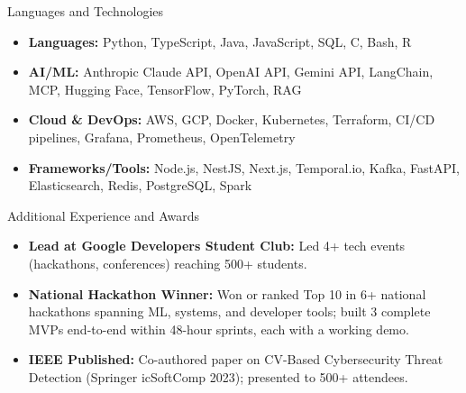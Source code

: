 \documentclass[]{mcdowellcv}
\begin{document}
\begin{cvsection}{Languages and Technologies}
  \begin{cvsubsection}{}{}{}
    \begin{itemize}
      \item \textbf{Languages:} Python, TypeScript, Java, JavaScript, SQL, C, Bash, R
      \item \textbf{AI/ML:} Anthropic Claude API, OpenAI API, Gemini API, LangChain, MCP, Hugging Face, TensorFlow, PyTorch, RAG
      \item \textbf{Cloud \& DevOps:} AWS, GCP, Docker, Kubernetes, Terraform, CI/CD pipelines, Grafana, Prometheus, OpenTelemetry
      \item \textbf{Frameworks/Tools:} Node.js, NestJS, Next.js, Temporal.io, Kafka, FastAPI, Elasticsearch, Redis, PostgreSQL, Spark
    \end{itemize}
  \end{cvsubsection}
\end{cvsection}

\begin{cvsection}{Additional Experience and Awards}
  \begin{cvsubsection}{}{}{}
    \begin{itemize}
      \item \textbf{Lead at Google Developers Student Club:} Led 4+ tech events (hackathons, conferences) reaching 500+ students.
      \item \textbf{National Hackathon Winner:} Won or ranked Top 10 in 6+ national hackathons spanning ML, systems, and developer tools; built 3 complete MVPs end-to-end within 48-hour sprints, each with a working demo.
      \item \textbf{IEEE Published:} Co-authored paper on CV-Based Cybersecurity Threat Detection (Springer icSoftComp 2023); presented to 500+ attendees.
    \end{itemize}
  \end{cvsubsection}
\end{cvsection}
\end{document}
